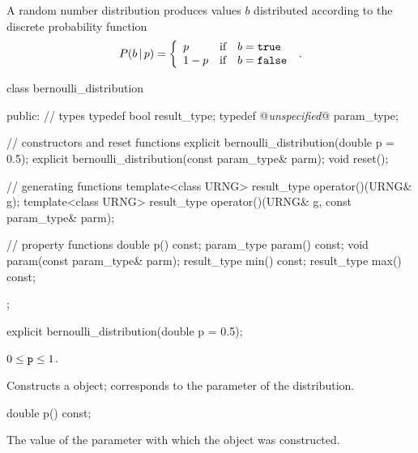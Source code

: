 \pnum
A  random number distribution
produces  values $b$
distributed according to
the discrete probability function
%
\[%
 P(b\,|\,p)
      = \left\{ \begin{array}{lcl}
          p    &  \mbox{if} & b = \tcode{true} \\
          1-p  &  \mbox{if} & b = \tcode{false}
        \end{array}\right.
\; \mbox{.}
\]

\begin{codeblock}
class bernoulli_distribution
{
public:
 // types
 typedef bool result_type;
 typedef @\textit{unspecified}@ param_type;

 // constructors and reset functions
 explicit bernoulli_distribution(double p = 0.5);
 explicit bernoulli_distribution(const param_type& parm);
 void reset();

 // generating functions
 template<class URNG>
   result_type operator()(URNG& g);
 template<class URNG>
   result_type operator()(URNG& g, const param_type& parm);

 // property functions
 double p() const;
 param_type param() const;
 void param(const param_type& parm);
 result_type min() const;
 result_type max() const;
};
\end{codeblock}


%
\begin{itemdecl}
explicit bernoulli_distribution(double p = 0.5);
\end{itemdecl}

\begin{itemdescr}
\pnum\requires
 $0 \leq \texttt{p} \leq 1$.

\pnum\effects Constructs a  object;
 corresponds to the parameter of the distribution.
\end{itemdescr}

%
%
\begin{itemdecl}
double p() const;
\end{itemdecl}

\begin{itemdescr}
\pnum\returns The value of the  parameter
 with which the object was constructed.
\end{itemdescr}

